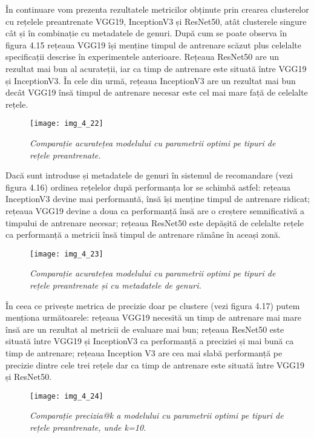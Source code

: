 \vspace{5mm}
În continuare vom prezenta rezultatele metricilor obținute prin crearea clusterelor cu rețelele preantrenate VGG19, InceptionV3 și ResNet50, atât clusterele singure cât și în combinație cu metadatele de genuri. După cum se poate observa în figura 4.15 rețeaua VGG19 își menține timpul de antrenare scăzut plus celelalte specificații descrise în experimentele anterioare. Rețeaua ResNet50 are un rezultat mai bun al acurateții, iar ca timp de antrenare este situată între VGG19 și InceptionV3. În cele din urmă, rețeaua InceptionV3 are un rezultat mai bun decât VGG19 însă timpul de antrenare necesar este cel mai mare față de celelalte rețele.
\begin{figure}[!h]
	\centering
	\texttt{[image: img\_4\_22]}
	\caption[Comparație acuratețea modelului cu parametrii optimi pe tipuri de rețele preantrenate]{\textit{Comparație acuratețea modelului cu parametrii optimi pe tipuri de rețele preantrenate.}}
\end{figure}

Dacă sunt introduse și metadatele de genuri în sistemul de recomandare (vezi figura 4.16) ordinea rețelelor după performanța lor se schimbă astfel: rețeaua InceptionV3 devine mai performantă, însă își menține timpul de antrenare ridicat; rețeaua VGG19 devine a doua ca performanță însă are o creștere semnificativă a timpului de antrenare necesar; rețeaua ResNet50 este depășită de celelalte rețele ca performanță a metricii însă timpul de antrenare rămâne în aceași zonă.
\begin{figure}[!h]
	\centering
	\texttt{[image: img\_4\_23]}
	\caption[Comparație acuratețea modelului cu parametrii optimi pe tipuri de rețele preantrenate și cu metadatele de genuri]{\textit{Comparație acuratețea modelului cu parametrii optimi pe tipuri de rețele preantrenate și cu metadatele de genuri.}}
\end{figure}

În ceea ce privește metrica de precizie doar pe clustere (vezi figura 4.17) putem menționa următoarele: rețeaua VGG19 necesită un timp de antrenare mai mare însă are un rezultat al metricii de evaluare mai bun; rețeaua ResNet50 este situată între VGG19 și InceptionV3 ca performanță a preciziei și mai bună ca timp de antrenare; rețeaua Inception V3 are cea mai slabă performanță pe precizie dintre cele trei rețele dar ca timp de antrenare este situată între VGG19 și ResNet50.
\begin{figure}[!h]
	\centering
	\texttt{[image: img\_4\_24]}
	\caption[Comparație precizia@k a modelului cu parametrii optimi pe tipuri de rețele preantrenate]{\textit{Comparație precizia@k a modelului cu parametrii optimi pe tipuri de rețele preantrenate, unde k=10.}}
\end{figure}


